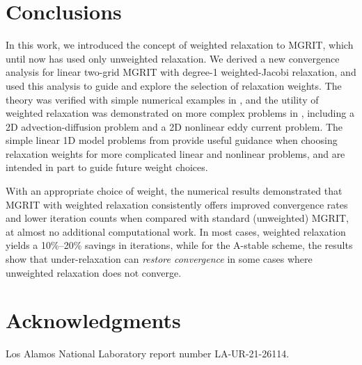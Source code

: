 \documentclass[VANCOUVER,STIX1COL]{WileyNJD-v2}
\begin{document}
\section{Conclusions}
\label{sec:conc}
In this work, we introduced the concept of weighted relaxation to MGRIT, which until now has used only unweighted relaxation. We derived a new convergence analysis for linear two-grid MGRIT with degree-1 weighted-Jacobi relaxation, and used this analysis to guide and explore  the selection of relaxation weights. The theory was verified with simple numerical examples in , and the utility of weighted relaxation was demonstrated on more complex problems in , including a 2D advection-diffusion problem and a 2D nonlinear eddy current problem. The simple linear 1D model problems from  provide useful guidance when choosing relaxation weights for more complicated linear and nonlinear problems, and are intended in part to guide future weight choices.

With an appropriate choice of weight, the numerical results demonstrated that MGRIT with weighted relaxation consistently offers improved convergence rates and lower iteration counts when compared with standard (unweighted) MGRIT, at almost no additional computational work. In most cases, weighted relaxation yields a 10\%--20\% savings in iterations, while for the A-stable scheme, the results show that under-relaxation can \emph{restore convergence} in some cases where unweighted relaxation does not converge.

\section*{Acknowledgments}
Los Alamos National Laboratory report number LA-UR-21-26114.






\end{document}
